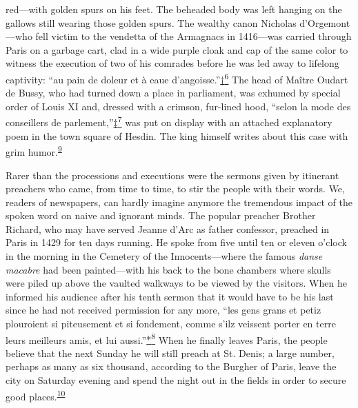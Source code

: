 red---with golden spurs on his feet. The beheaded body was left hanging
on the gallows still wearing those golden spurs. The wealthy canon
Nicholas d'Orgemont---who fell victim to the vendetta of the Armagnacs
in 1416---was carried through Paris on a garbage cart, clad in a wide
purple cloak and cap of the same color to witness the execution of two
of his comrades before he was led away to lifelong captivity: ``au pain
de doleur et à eaue
d'angoisse.''\protect\hypertarget{08_Chapter_One__THE_PASSIONATE_INTE.xhtmlux5cux23id_2257}{\protect\hyperlink{23_NOTES.xhtmlux5cux23id_2258}{†\textsuperscript{6}}}
The head of Maître Oudart de Bussy, who had turned down a place in
parliament, was exhumed by special order of Louis XI and, dressed with a
crimson, fur-lined hood, ``selon la mode des conseillers de
parlement,''\protect\hypertarget{08_Chapter_One__THE_PASSIONATE_INTE.xhtmlux5cux23id_2259}{\protect\hyperlink{23_NOTES.xhtmlux5cux23id_2261}{‡\textsuperscript{7}}}
was put on display with an attached explanatory poem in the town square
of Hesdin. The king himself writes about this case with grim
humor.\textsuperscript{\protect\hypertarget{08_Chapter_One__THE_PASSIONATE_INTE.xhtmlux5cux23id_2212}{\protect\hyperlink{23_NOTES.xhtmlux5cux23id_2213}{9}}}

Rarer than the processions and executions were the sermons given by
itinerant preachers who came, from time to time, to stir the people with
their words. We, readers of newspapers, can hardly imagine anymore the
tremendous impact of the spoken word on naive and ignorant minds. The
popular preacher Brother Richard, who may have served Jeanne d'Arc as
father confessor, preached in Paris in 1429 for ten days running. He
spoke from five until ten
\protect\hypertarget{08_Chapter_One__THE_PASSIONATE_INTE.xhtmlux5cux23page_5}{}{}or
eleven o'clock in the morning in the Cemetery of the Innocents---where
the famous \emph{danse macabre} had been painted---with his back to the
bone chambers where skulls were piled up above the vaulted walkways to
be viewed by the visitors. When he informed his audience after his tenth
sermon that it would have to be his last since he had not received
permission for any more, ``les gens grans et petiz plouroient si
piteusement et si fondement, comme s'ilz veissent porter en terre leurs
meilleurs amis, et lui
aussi.''\protect\hypertarget{08_Chapter_One__THE_PASSIONATE_INTE.xhtmlux5cux23id_2260}{\protect\hyperlink{23_NOTES.xhtmlux5cux23id_2263}{*\textsuperscript{8}}}
When he finally leaves Paris, the people believe that the next Sunday he
will still preach at St. Denis; a large number, perhaps as many as six
thousand, according to the Burgher of Paris, leave the city on Saturday
evening and spend the night out in the fields in order to secure good
places.\textsuperscript{\protect\hypertarget{08_Chapter_One__THE_PASSIONATE_INTE.xhtmlux5cux23id_2210}{\protect\hyperlink{23_NOTES.xhtmlux5cux23id_2211}{10}}}

